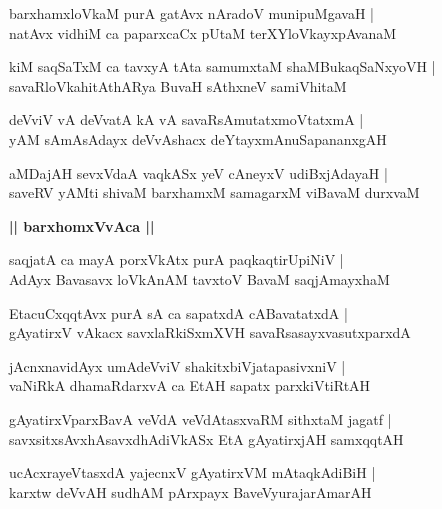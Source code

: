 \documentclass[twoside,12pt,openright]{book}
\newcounter{shloka}[chapter]
\def\uvaca#1{\centerline{{\large\textbf{#1}}}}
\begin{document}
\begin{shloka}%
barxhamxloVkaM purA gatAvx nAradoV munipuMgavaH |\\
natAvx vidhiM ca paparxcaCx pUtaM terXYloVkayxpAvanaM 
\end{shloka}

\begin{shloka}%
kiM saqSaTxM ca tavxyA tAta samumxtaM shaMBukaqSaNxyoVH |\\
savaRloVkahitAthARya BuvaH sAthxneV samiVhitaM 
\end{shloka}

\begin{shloka}%
deVviV vA deVvatA kA vA savaRsAmutatxmoVtatxmA |\\
yAM sAmAsAdayx deVvAshacx deYtayxmAnuSapananxgAH 
\end{shloka}

\begin{shloka}%
aMDajAH sevxVdaA vaqkASx yeV cAneyxV udiBxjAdayaH |\\
saveRV yAMti shivaM barxhamxM samagarxM viBavaM durxvaM 
\end{shloka}

\uvaca{|| barxhomxVvAca ||}

\begin{shloka}%
saqjatA ca mayA porxVkAtx purA paqkaqtirUpiNiV |\\
AdAyx Bavasavx loVkAnAM tavxtoV BavaM saqjAmayxhaM 
\end{shloka}

\begin{shloka}%
EtacuCxqqtAvx purA sA ca sapatxdA cABavatatxdA |\\
gAyatirxV vAkacx savxlaRkiSxmXVH savaRsasayxvasutxparxdA 
\end{shloka}

\begin{shloka}%
jAcnxnavidAyx umAdeVviV shakitxbiVjatapasivxniV |\\
vaNiRkA dhamaRdarxvA ca EtAH sapatx parxkiVtiRtAH 
\end{shloka}

\begin{shloka}%
gAyatirxVparxBavA veVdA veVdAtasxvaRM sithxtaM jagatf |\\
savxsitxsAvxhAsavxdhAdiVkASx EtA gAyatirxjAH samxqqtAH 
\end{shloka}

\begin{shloka}%
ucAcxrayeVtasxdA yajecnxV gAyatirxVM mAtaqkAdiBiH |\\
karxtw deVvAH sudhAM pArxpayx BaveVyurajarAmarAH 
\end{shloka}
\end{document}
